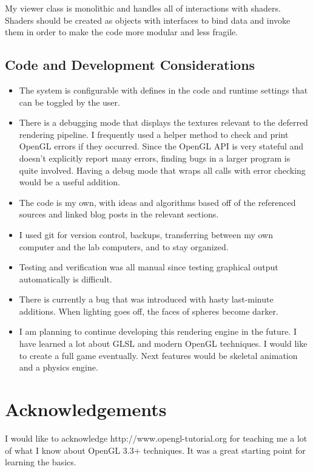 \documentclass[oneside]{book}
\begin{document}
      My viewer class is monolithic and handles all of interactions with shaders. Shaders should be created as objects with interfaces to bind data and invoke them in order to make the code more modular and less fragile.

    \subsection{Code and Development Considerations}
      \begin{itemize}
        \item The system is configurable with defines in the code and runtime settings that can be toggled by the user.

        \item There is a debugging mode that displays the textures relevant to the deferred rendering pipeline. I frequently used a helper method to check and print OpenGL errors if they occurred. Since the OpenGL API is very stateful and doesn't explicitly report many errors, finding bugs in a larger program is quite involved. Having a debug mode that wraps all calls with error checking would be a useful addition.

        \item The code is my own, with ideas and algorithms based off of the referenced sources and linked blog posts in the relevant sections.

        \item I used git for version control, backups, transferring between my own computer and the lab computers, and to stay organized.

        \item Testing and verification was all manual since testing graphical output automatically is difficult.

        \item There is currently a bug that was introduced with hasty last-minute additions. When lighting goes off, the faces of spheres become darker.

        \item I am planning to continue developing this rendering engine in the future. I have learned a lot about GLSL and modern OpenGL techniques. I would like to create a full game eventually. Next features would be skeletal animation and a physics engine.
    \end{itemize}


    \section{Acknowledgements}
      I would like to acknowledge http://www.opengl-tutorial.org for teaching me a lot of what I know about OpenGL 3.3+ techniques. It was a great starting point for learning the basics.
\end{document}
